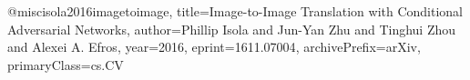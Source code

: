 @misc{isola2016imagetoimage,
    title={Image-to-Image Translation with Conditional Adversarial Networks},
    author={Phillip Isola and Jun-Yan Zhu and Tinghui Zhou and Alexei A. Efros},
    year={2016},
    eprint={1611.07004},
    archivePrefix={arXiv},
    primaryClass={cs.CV}
}